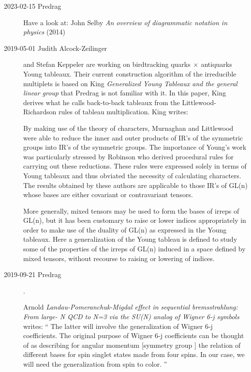 \begin{description}
   \item[2023-02-15 Predrag]
Have a look at:
John Selby
{{\em An overview of diagrammatic notation in physics}} (2014)

\item[2019-05-01 Judith Alcock-Zeilinger] and Stefan Keppeler
are working on birdtracking quarks$~\times~$antiquarks Young tableaux.
Their current construction algorithm of the irreducible multiplets is based on
King {\em Generalized {Young Tableaux} and the general linear group}
that Predrag is not familiar with it. In this paper, King derives what he calls
back-to-back tableaux from the Littlewood-Richardson rules of tableau
multiplication. King writes:

By making use of the theory of characters, Murnaghan and
Littlewood  were able to reduce the inner and outer products of
IR's of the symmetric groups into IR's of the symmetric groups. The importance of
Young's work was particularly stressed by Robinson who derived
procedural rules for carrying out these reductions. These rules were expressed
solely in terms of Young tableaux and thus obviated the necessity of calculating
characters. The results obtained by these authors are applicable to those IR's of
GL(n) whose bases are either covariant or contravariant tensors.

More generally, mixed tensors may be used to form the bases of irreps of GL(n),
but it has been customary to raise or lower indices appropriately in order to
make use of the duality of GL(n) as expressed in the Young tableaux. Here a
generalization of the Young tableau is defined to study some of the properties of
the irreps of GL(n) induced in a space defined by mixed tensors, without recourse
to raising or lowering of indices.

\item[2019-09-21  Predrag].

Arnold {\em {Landau-Pomeranchuk-Migdal} effect in sequential
bremsstrahlung: {From large- N {QCD} to N=3} via the {SU}(N) analog of
{Wigner }6-j symbols} writes:
``
The latter will involve the  generalization of Wigner 6-j
coefficients. The original purpose of Wigner 6-j coefficients can be
thought of as describing for angular momentum [symmetry group ]
the relation of different bases for spin singlet states made from four
spins. In our case, we will need the generalization from spin to color.
''


\end{description}
